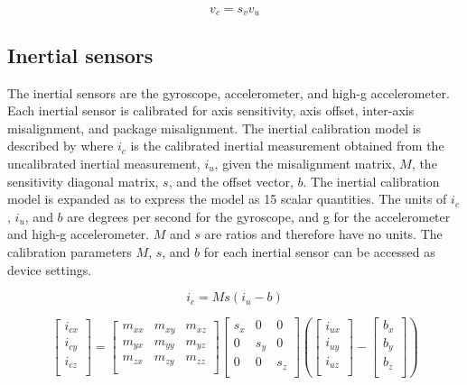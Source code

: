 \begin{equation}
\label{eq:batteryVoltmeter}
v_c = s_v v_u
\end{equation}

\subsection{Inertial sensors}
\label{sec:inertialSensor}

The inertial sensors are the gyroscope, accelerometer, and high-g accelerometer.  Each inertial sensor is calibrated for axis sensitivity, axis offset, inter-axis misalignment, and package misalignment.  The inertial calibration model is described by  where $i_c$ is the calibrated inertial measurement obtained from the uncalibrated inertial measurement, $i_u$, given the misalignment matrix, $M$, the sensitivity diagonal matrix, $s$, and the offset vector, $b$.  The inertial calibration model is expanded as  to express the model as 15 scalar quantities.  The units of $i_c$, $i_u$, and $b$ are degrees per second for the gyroscope, and g for the accelerometer and high-g accelerometer.  $M$ and $s$ are ratios and therefore have no units.  The calibration parameters $M$, $s$, and $b$ for each inertial sensor can be accessed as device settings.

\begin{equation}
\label{eq:inertial}
i_c = M s (i_u - b)
\end{equation}

\begin{equation}
\label{eq:inertialExpanded}
    \begin{bmatrix}
        i_{cx}\\
        i_{cy}\\
        i_{cz}\\
    \end{bmatrix}
    =
    \begin{bmatrix}
        m_{xx} & m_{xy} & m_{xz}\\
        m_{yx} & m_{yy} & m_{yz}\\
        m_{zx} & m_{zy} & m_{zz}\\
    \end{bmatrix}
    \begin{bmatrix}
        s_{x} & 0 & 0\\
        0 & s_{y} & 0\\
        0 & 0 & s_{z}\\
    \end{bmatrix}
    \left(
    \begin{bmatrix}
        i_{ux}\\
        i_{uy}\\
        i_{uz}\\
    \end{bmatrix}
    -
    \begin{bmatrix}
        b_{x}\\
        b_{y}\\
        b_{z}\\
    \end{bmatrix}
    \right)
\end{equation}


